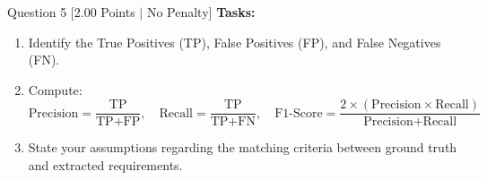 \documentclass[11pt,a4paper]{article}
\begin{document}
\begin{questionbox}{Question 5 \hfill [2.00 Points $\vert$ No Penalty]}
\textbf{Tasks:}
\begin{enumerate}[label=\arabic*.]
    \item Identify the True Positives (TP), False Positives (FP), and False Negatives (FN).
    \item Compute:
    \begin{equation*}
        \text{Precision} = \frac{\text{TP}}{\text{TP} + \text{FP}}, \quad
        \text{Recall} = \frac{\text{TP}}{\text{TP} + \text{FN}}, \quad
        \text{F1-Score} = \frac{2 \times (\text{Precision} \times \text{Recall})}{\text{Precision} + \text{Recall}}
    \end{equation*}
    \item State your assumptions regarding the matching criteria between ground truth and extracted requirements.
\end{enumerate}
\end{questionbox}

\newpage
\end{document}
